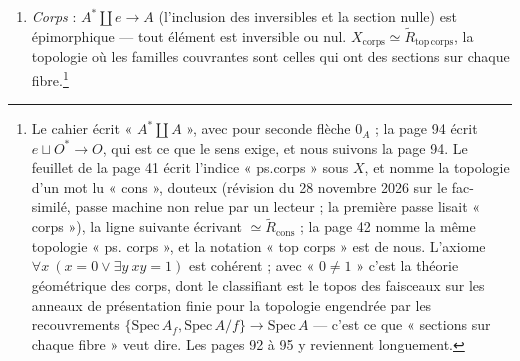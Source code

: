 \documentclass[11pt,a4paper]{article}
\begin{document}
\begin{enumerate}
\item[11)] \emph{Corps} : $A^{*} \amalg e \to A$ (l'inclusion des
inversibles et la section nulle) est épimorphique — tout élément est
inversible ou nul. $X_{\mathrm{corps}} \simeq \widetilde{R}_{\mathrm{top\,
corps}}$, la topologie où les familles couvrantes sont celles qui ont des
sections sur chaque fibre.\footnote{Le cahier écrit « $A^{*} \amalg A$ »,
avec pour seconde flèche $0_{A}$ ; la page 94 écrit $e \sqcup O^{*} \to O$,
qui est ce que le sens exige, et nous suivons la page 94. Le feuillet de la
page 41 écrit l'indice « ps.corps » sous $X$, et nomme la topologie d'un mot
lu « cons », douteux (révision du 28 novembre 2026 sur le fac-similé, passe machine non relue par un lecteur ; la première passe lisait « corps »), la ligne
suivante écrivant $\simeq \widetilde{R}_{\mathrm{cons}}$ ; la page 42 nomme
la même topologie « ps. corps », et la notation « top corps » est de nous.
L'axiome
$\forall x\ (x = 0 \vee \exists y\ xy = 1)$ est cohérent ; avec « $0 \neq
1$ » c'est la théorie géométrique des corps, dont le classifiant est le
topos des faisceaux sur les anneaux de présentation finie pour la
topologie engendrée par les recouvrements $\{\mathrm{Spec}\,A_{f},
\mathrm{Spec}\,A/f\} \to \mathrm{Spec}\,A$ — c'est ce que « sections sur
chaque fibre » veut dire. Les pages 92 à 95 y reviennent longuement.}


\end{enumerate}
\end{document}
